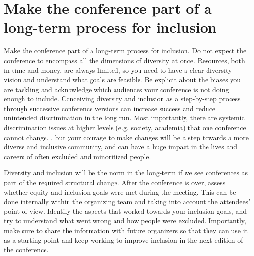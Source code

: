 \documentclass[10pt,letterpaper]{article}
\begin{document}




\section{Make the conference part of a long-term process for inclusion}
\label{rule_process}

Make the conference part of a long-term process for inclusion. Do not expect the conference to encompass all the dimensions of diversity at once.  Resources, both in time and money, are always limited, so you need to have a clear diversity vision and understand what goals are feasible. Be explicit about the biases you are tackling and acknowledge which audiences your conference is not doing enough to include. Conceiving diversity and inclusion as a step-by-step process through successive conference versions can increase success and reduce unintended discrimination in the long run.
Most importantly, there are systemic discrimination issues at higher levels (e.g. society, academia) that one conference cannot change. 
, but your courage to make changes will be a step towards a more diverse and inclusive community, and can have a huge impact in the lives and careers of often excluded and minoritized people.

Diversity and inclusion will be the norm in the long-term if we see conferences as part of the required structural change. 
After the conference is over, assess whether equity and inclusion goals were met during the meeting. 
This can be done internally within the organizing team and taking into account the attendees' point of view. 
Identify the aspects that worked towards your inclusion goals, and try to understand what went wrong and how people were excluded.
Importantly, make sure to share the information with future organizers so that they can use it as a starting point and keep working to improve inclusion in the next edition of the conference. 
\end{document}
